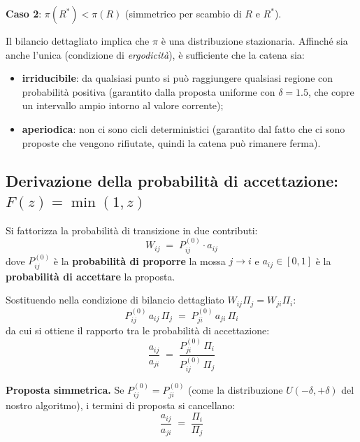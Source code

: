 \documentclass[12pt,a4paper]{article}
\begin{document}
\textbf{Caso 2}: $\pi(R^*) < \pi(R)$ (simmetrico per scambio di $R$ e $R^*$). \checkmark

Il bilancio dettagliato implica che $\pi$ è una distribuzione stazionaria. Affinché
sia anche l'unica (condizione di \emph{ergodicità}), è sufficiente che la catena sia:
\begin{itemize}
  \item \textbf{irriducibile}: da qualsiasi punto si può raggiungere qualsiasi regione
        con probabilità positiva (garantito dalla proposta uniforme con $\delta = 1.5$,
        che copre un intervallo ampio intorno al valore corrente);
  \item \textbf{aperiodica}: non ci sono cicli deterministici (garantito dal fatto che
        ci sono proposte che vengono rifiutate, quindi la catena può rimanere ferma).
\end{itemize}

\subsection{Derivazione della probabilità di accettazione: $F(z) = \min(1,z)$}

Si fattorizza la probabilità di transizione in due contributi:
\begin{equation}
  W_{ij} \;=\; P^{(0)}_{ij} \cdot a_{ij}
\end{equation}
dove $P^{(0)}_{ij}$ è la \textbf{probabilità di proporre} la mossa $j \to i$
e $a_{ij} \in [0,1]$ è la \textbf{probabilità di accettare} la proposta.

Sostituendo nella condizione di bilancio dettagliato $W_{ij}\Pi_j = W_{ji}\Pi_i$:
\begin{equation}
  P^{(0)}_{ij}\, a_{ij}\, \Pi_j \;=\; P^{(0)}_{ji}\, a_{ji}\, \Pi_i
\end{equation}
da cui si ottiene il rapporto tra le probabilità di accettazione:
\begin{equation}
  \frac{a_{ij}}{a_{ji}} \;=\; \frac{P^{(0)}_{ji}\,\Pi_i}{P^{(0)}_{ij}\,\Pi_j}
  \label{eq:rapporto_acc}
\end{equation}

\textbf{Proposta simmetrica.} Se $P^{(0)}_{ij} = P^{(0)}_{ji}$ (come la distribuzione
$U(-\delta, +\delta)$ del nostro algoritmo), i termini di proposta si cancellano:
\begin{equation}
  \frac{a_{ij}}{a_{ji}} \;=\; \frac{\Pi_i}{\Pi_j}
\end{equation}
\end{document}
